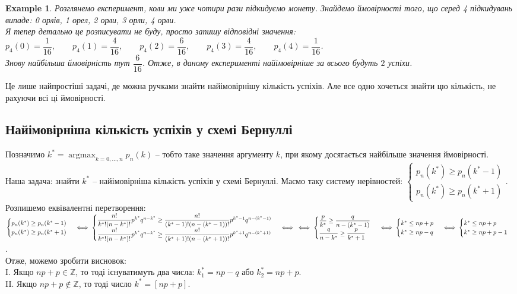 \documentclass[a4paper, 10pt]{article}
\theoremstyle{theoremdd}
\newtheorem{example}[theorem]{Example}
\DeclareMathOperator*{\argmax}{argmax}
\begin{document}
\begin{example}
Розглянемо експеримент, коли ми уже чотири рази підкидуємо монету. Знайдемо ймовірності того, що серед 4 підкидувань випаде: 0 орлів, 1 орел, 2 орли, 3 орли, 4 орли.\\
Я тепер детально це розписувати не буду, просто запишу відповідні значення:\\
$p_4(0) = \dfrac{1}{16}, \qquad p_4(1) = \dfrac{4}{16}, \qquad p_4(2) = \dfrac{6}{16}, \qquad p_4(3) = \dfrac{4}{16}, \qquad p_4(4) = \dfrac{1}{16}$.\\
Знову найбільша ймовірність тут $\dfrac{6}{16}$. Отже, в даному експерименті найімовірніше за всього будуть $2$ успіхи.
\end{example}
\noindent
Це лише найпростіші задачі, де можна ручками знайти найімовірнішу кількість успіхів. Але все одно хочеться знайти цю кількість, не рахуючи всі ці ймовірності.

\subsection{Найімовірніша кількість успіхів у схемі Бернуллі}
Позначимо $k^* = \displaystyle\argmax_{k = 0,\dots,n} p_n(k)$ -- тобто таке значення аргументу $k$, при якому досягається найбільше значення ймовірності.\\
Наша задача: знайти $k^*$ -- найімовірніша кількість успіхів у схемі Бернуллі.
Маємо таку систему нерівностей: $\begin{cases} p_n(k^*) \geq p_n(k^*-1) \\ p_n(k^*) \geq p_n(k^*+1) \end{cases}$.\\
Розпишемо еквівалентні перетворення:\\
$\begin{cases} p_n(k^*) \geq p_n(k^*-1) \\ p_n(k^*) \geq p_n(k^*+1) \end{cases} \iff \begin{cases} \dfrac{n!}{k^*! (n-k^*)!} p^{k^*} q^{n-k^*} \geq \dfrac{n!}{(k^*-1)!(n-(k^*-1))!} p^{k^*-1} q^{n-(k^*-1)} \\ \dfrac{n!}{k^*! (n-k^*)!} p^{k^*} q^{n-k^*} \geq \dfrac{n!}{(k^*+1)!(n-(k^*+1))!} p^{k^*+1} q^{n-(k^*+1)}  \end{cases} \iff
\\ \iff \begin{cases} \dfrac{p}{k^*} \geq \dfrac{q}{n-(k^*-1)} \\ \dfrac{q}{n-k^*} \geq \dfrac{p}{k^*+1} \end{cases} \iff \begin{cases} k^* \leq np + p \\ k^* \geq np - q \end{cases} \iff \begin{cases} k^* \leq np + p \\ k^* \geq np+p - 1 \end{cases}$.\\
Отже, можемо зробити висновок:\\
I. Якщо $np+p \in \mathbb{Z}$, то тоді існуватимуть два числа: $k_1^* = np-q$ або $k_2^* = np+p$.\\
II. Якщо $np+p \notin \mathbb{Z}$, то тоді число $k^* = [np+p]$.
\end{document}
